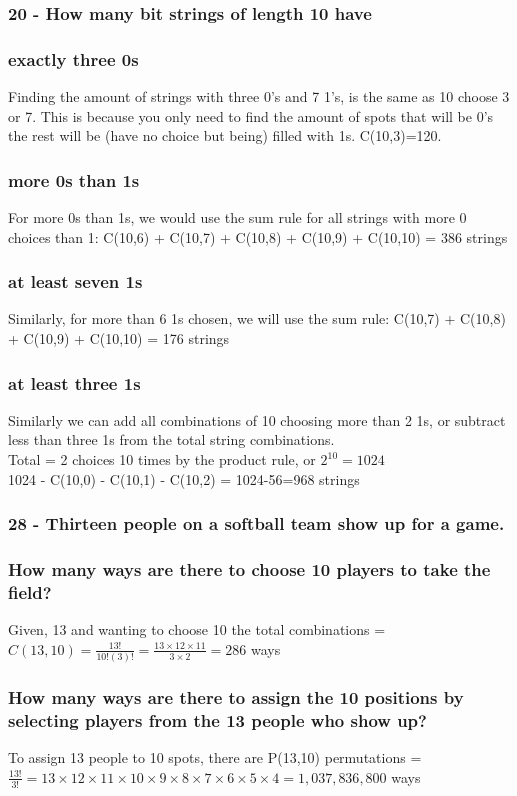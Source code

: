 \documentclass{article}
\begin{document}
\subsubsection*{20 - How many bit strings of length 10 have}
\subsubsection[20a]{exactly three 0s}
Finding the amount of strings with three 0's and 7 1's, is the same as 10 choose 3 or 7. This is because you only need to find the amount of spots that will be 0's the rest will be (have no choice but being) filled with 1s. C(10,3)=120.
\subsubsection[20b]{more 0s than 1s}
For more 0s than 1s, we would use the sum rule for all strings with more 0 choices than 1: C(10,6) + C(10,7) + C(10,8) + C(10,9) + C(10,10) = 386 strings
\subsubsection[20c]{at least seven 1s}
Similarly, for more than 6 1s chosen, we will use the sum rule: C(10,7) + C(10,8) + C(10,9) + C(10,10) = 176 strings
\subsubsection[20d]{at least three 1s}
Similarly we can add all combinations of 10 choosing more than 2 1s, or subtract less than three 1s from the total string combinations.\\
Total = 2 choices 10 times by the product rule, or $2^{10} = 1024$\\
1024 - C(10,0) - C(10,1) - C(10,2) = 1024-56=968 strings
\subsubsection*{28 - Thirteen people on a softball team show up for a game.}
\subsubsection[28a]{How many ways are there to choose 10 players to take the field?}
Given, 13 and wanting to choose 10 the total combinations = $C(13,10) = \frac{13!}{10!(3)!}=\frac{13\times 12 \times 11}{3\times2} = 286$ ways
\subsubsection[28b]{How many ways are there to assign the 10 positions by selecting players from the 13 people who show up?}
To assign 13 people to 10 spots, there are P(13,10) permutations = $\frac{13!}{3!} = 13\times12\times11\times10\times9\times8\times7\times6\times5\times4=1,037,836,800$ ways
\end{document}
